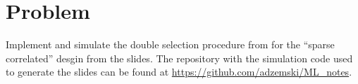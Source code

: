 \documentclass[a4paper]{scrartcl}
\begin{document}
\section*{Problem~}

Implement and simulate the double selection procedure from \textcite{belloni2014inference} for the ``sparse correlated'' desgin from the slides. The repository with the simulation code used to generate the slides can be found at \url{https://github.com/adzemski/ML_notes}.
\end{document}
